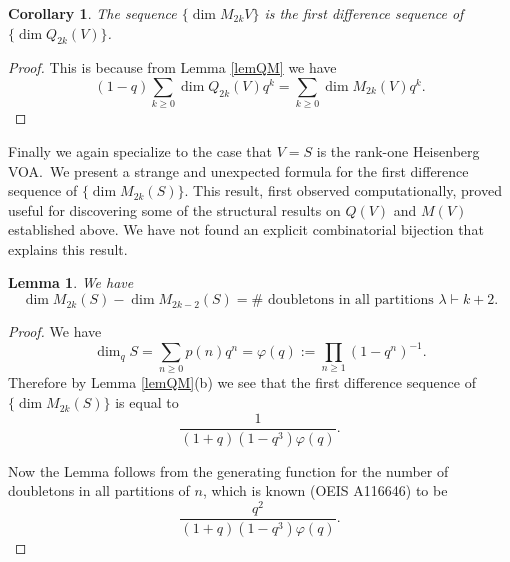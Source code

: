 \documentclass[12pt]{amsart}
\theoremstyle{plain}
\newtheorem{lem}[thm]{Lemma}
\newtheorem{cor}[thm]{Corollary}
\theoremstyle{definition}
\theoremstyle{remark}
\begin{document}
\begin{cor}
   The sequence $\{\dim M_{2k}{V}\}$ is the first difference sequence of $\{\dim Q_{2k}(V)\}$. 
\end{cor}
\begin{proof}
This is because from Lemma \ref{lemQM} we have
$$ (1-q)\sum_{k\geq0} \dim Q_{2k}(V)q^k= \sum_{k\geq0} \dim M_{2k}(V)q^k.$$
\end{proof}

Finally we again specialize to the case that $V=S$ is the rank-one Heisenberg VOA.\ We present a strange and unexpected formula for the first difference sequence of
$\{\dim M_{2k}(S)\}$. This result, first observed computationally, proved useful for discovering some of the structural results on $Q(V)$ and $M(V)$ established above. We have not found an explicit combinatorial bijection that explains this result.
\begin{lem} We have
$$\dim M_{2k}(S)-\dim M_{2k-2}(S)= \mbox{$\#$ doubletons in all partitions $\lambda \vdash k+2$}.$$
\end{lem}
\begin{proof}
   We have
   $$\dim_q S=\sum_{n\geq0} p(n)q^n = \varphi(q):= \prod_{n\geq 1} (1-q^n)^{-1}.$$
   Therefore by Lemma \ref{lemQM}(b) we see that the first difference sequence of $\{\dim M_{2k}(S)\}$ is equal to
   $$ \frac{1}{(1+q)(1-q^3)\varphi(q)}.$$

   Now the Lemma follows from the generating function for the number of doubletons in all partitions of $n$, which is
   known (OEIS A116646) to be
   $$ \frac{q^2}{(1+q)(1-q^3)\varphi(q)}.$$
\end{proof}
\end{document}

